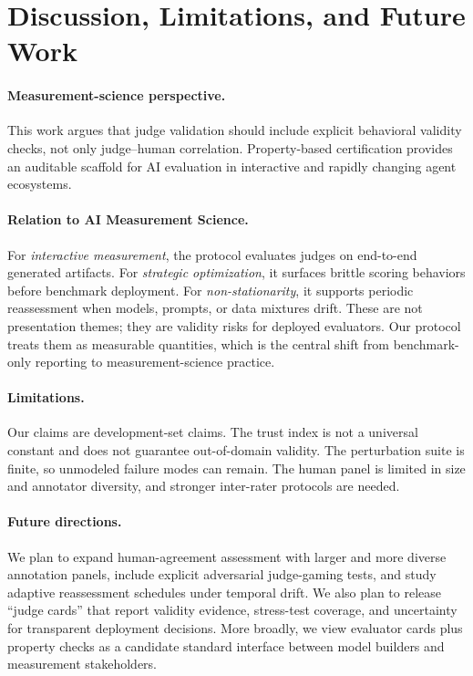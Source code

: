 \section{Discussion, Limitations, and Future Work}

\paragraph{Measurement-science perspective.}
This work argues that judge validation should include explicit behavioral validity checks, not only judge--human correlation.
Property-based certification provides an auditable scaffold for AI evaluation in interactive and rapidly changing agent ecosystems.

\paragraph{Relation to AI Measurement Science.}
For \emph{interactive measurement}, the protocol evaluates judges on end-to-end generated artifacts.
For \emph{strategic optimization}, it surfaces brittle scoring behaviors before benchmark deployment.
For \emph{non-stationarity}, it supports periodic reassessment when models, prompts, or data mixtures drift.
These are not presentation themes; they are validity risks for deployed evaluators.
Our protocol treats them as measurable quantities, which is the central shift from benchmark-only reporting to measurement-science practice.

\paragraph{Limitations.}
Our claims are development-set claims.
The trust index is not a universal constant and does not guarantee out-of-domain validity.
The perturbation suite is finite, so unmodeled failure modes can remain.
The human panel is limited in size and annotator diversity, and stronger inter-rater protocols are needed.

\paragraph{Future directions.}
We plan to expand human-agreement assessment with larger and more diverse annotation panels, include explicit adversarial judge-gaming tests, and study adaptive reassessment schedules under temporal drift.
We also plan to release ``judge cards'' that report validity evidence, stress-test coverage, and uncertainty for transparent deployment decisions.
More broadly, we view evaluator cards plus property checks as a candidate standard interface between model builders and measurement stakeholders.
